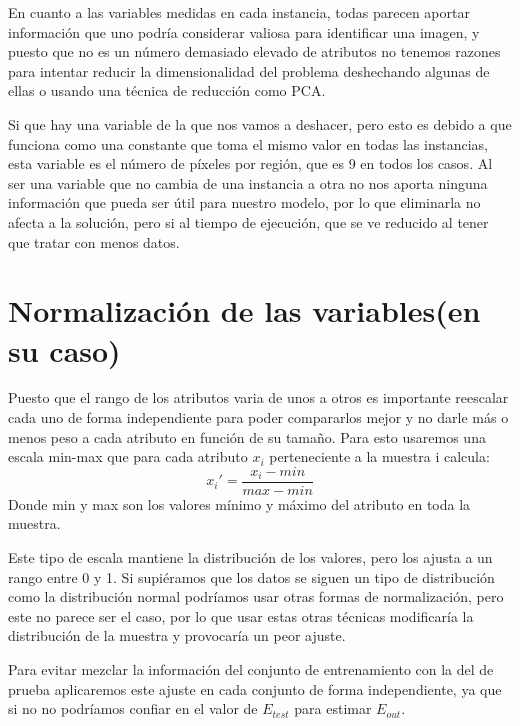 \documentclass{article}
\begin{document}
En cuanto a las variables medidas en cada instancia, todas parecen aportar información que uno podría considerar valiosa para identificar una imagen, y puesto que no es un número demasiado elevado de atributos no tenemos razones para intentar reducir la dimensionalidad del problema deshechando algunas de ellas o usando una técnica de reducción como PCA.
\par 
Si que hay una variable de la que nos vamos a deshacer, pero esto es debido a que funciona como una constante que toma el mismo valor en todas las instancias, esta variable es el número de píxeles por región, que es 9 en todos los casos. Al ser una variable que no cambia de una instancia a otra no nos aporta ninguna información que pueda ser útil para nuestro modelo, por lo que eliminarla no afecta a la solución, pero si al tiempo de ejecución, que se ve reducido al tener que tratar con menos datos.
	
	
	\section{Normalización de las variables(en su caso)} %
	Puesto que el rango de los atributos varia de unos a otros es importante reescalar cada uno de forma independiente para poder compararlos mejor y no darle más o menos peso a cada atributo en función de su tamaño. Para esto usaremos una escala min-max que para cada atributo $x_i$ perteneciente a la muestra i calcula:
\begin{equation}
x_i' = \frac{x_i-min}{max-min}
\end{equation}
\indent Donde min y max son los valores mínimo y máximo del atributo en toda la muestra.
\par 
Este tipo de escala mantiene la distribución de los valores, pero los ajusta a un rango entre 0 y 1.  Si supiéramos que los datos se siguen un tipo de distribución como la distribución normal podríamos usar otras formas de normalización, pero este no parece ser el caso, por lo que usar estas otras técnicas modificaría la distribución de la muestra y provocaría un peor ajuste.
\par 
Para evitar mezclar la información del conjunto de entrenamiento con la del de prueba aplicaremos este ajuste en cada conjunto de forma independiente, ya que si no no podríamos confiar en el valor de $E_{test}$ para estimar $E_{out}$.
	
\end{document}
